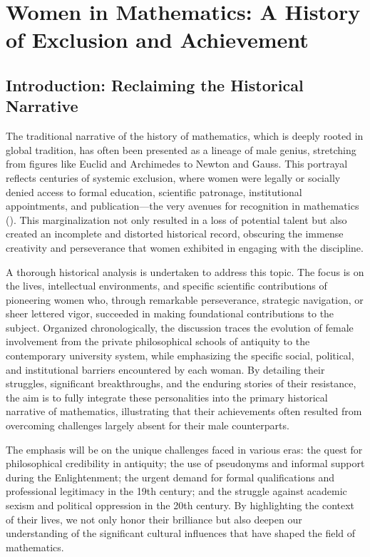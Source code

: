 \chapter{Women in Mathematics: A History of Exclusion and Achievement}\label{chap:Historychap}

\section{Introduction: Reclaiming the Historical Narrative}
The traditional narrative of the history of mathematics, which is deeply rooted in global tradition, has often been presented as a lineage of male genius, stretching from figures like Euclid and Archimedes to Newton and Gauss. This portrayal reflects centuries of systemic exclusion, where women were legally or socially denied access to formal education, scientific patronage, institutional appointments, and publication—the very avenues for recognition in mathematics (\cite{Alic86}). This marginalization not only resulted in a loss of potential talent but also created an incomplete and distorted historical record, obscuring the immense creativity and perseverance that women exhibited in engaging with the discipline.

A thorough historical analysis is undertaken to address this topic. The focus is on the lives, intellectual environments, and specific scientific contributions of pioneering women who, through remarkable perseverance, strategic navigation, or sheer lettered vigor, succeeded in making foundational contributions to the subject. Organized chronologically, the discussion traces the evolution of female involvement from the private philosophical schools of antiquity to the contemporary university system, while emphasizing the specific social, political, and institutional barriers encountered by each woman. By detailing their struggles, significant breakthroughs, and the enduring stories of their resistance, the aim is to fully integrate these personalities into the primary historical narrative of mathematics, illustrating that their achievements often resulted from overcoming challenges largely absent for their male counterparts.

The emphasis will be on the unique challenges faced in various eras: the quest for philosophical credibility in antiquity; the use of pseudonyms and informal support during the Enlightenment; the urgent demand for formal qualifications and professional legitimacy in the 19th century; and the struggle against academic sexism and political oppression in the 20th century. By highlighting the context of their lives, we not only honor their brilliance but also deepen our understanding of the significant cultural influences that have shaped the field of mathematics.

